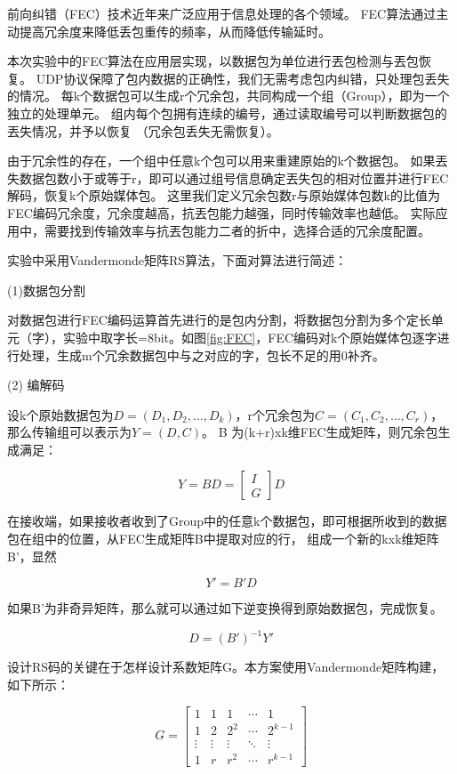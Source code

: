 \documentclass[onecolumn]{article}
\begin{document}
\begin{CJK*}{UTF8}{gbsn}
		前向纠错（FEC）技术近年来广泛应用于信息处理的各个领域。
		FEC算法通过主动提高冗余度来降低丢包重传的频率，从而降低传输延时。
		
		本次实验中的FEC算法在应用层实现，以数据包为单位进行丟包检测与丟包恢复。
		UDP协议保障了包内数据的正确性，我们无需考虑包内纠错，只处理包丢失的情况。
		每k个数据包可以生成r个冗余包，共同构成一个组（Group），即为一个独立的处理单元。
		组内每个包拥有连续的编号，通过读取编号可以判断数据包的丟失情况，并予以恢复
		（冗余包丢失无需恢复）。 
		
		由于冗余性的存在，一个组中任意k个包可以用来重建原始的k个数据包。
		如果丟失数据包数小于或等于r，即可以通过组号信息确定丟失包的相对位置并进行FEC解码，恢复k个原始媒体包。
		这里我们定义冗余包数r与原始媒体包数k的比值为FEC编码冗余度，冗余度越高，抗丟包能力越强，同时传输效率也越低。
		实际应用中，需要找到传输效率与抗丟包能力二者的折中，选择合适的冗余度配置。
		
		实验中采用Vandermonde矩阵RS算法，下面对算法进行简述：
		
		(1)数据包分割
		
		对数据包进行FEC编码运算首先进行的是包内分割，将数据包分割为多个定长单元（字），实验中取字长=8bit。如图\ref{fig:FEC}，FEC编码对k个原始媒体包逐字进行处理，生成m个冗余数据包中与之对应的字，包长不足的用0补齐。
		
		(2) 编解码
		
		设k个原始数据包为$D= (D_1,D_2,\dots,D_k)$，r个冗余包为$C=(C_1,C_2,\dots,C_r)$，那么传输组可以表示为$Y= (D,C)$。
		B 为(k+r)xk维FEC生成矩阵，则冗余包生成满足：
		
		$$Y=BD=\left[ \begin{array}{c}I\\G\end{array} \right ]D$$
		
		在接收端，如果接收者收到了Group中的任意k个数据包，即可根据所收到的数据包在组中的位置，从FEC生成矩阵B中提取对应的行， 组成一个新的kxk维矩阵B’，显然
		
		$$Y'=B'D$$
		
		如果B’为非奇异矩阵，那么就可以通过如下逆变换得到原始数据包，完成恢复。
		
		$$D=(B')^{-1}Y'$$
		
		设计RS码的关键在于怎样设计系数矩阵G。本方案使用Vandermonde矩阵构建，如下所示：
		
		$$G=
		\left[ \begin{array}{ccccc}
		1      & 1      & 1      & \cdots & 1       \\
		1      & 2      & 2^2    & \cdots & 2^{k-1} \\
		\vdots & \vdots & \vdots & \ddots & \vdots  \\
		1      & r      & r^2    & \cdots & r^{k-1}
		\end{array} 
		\right ]$$
		

\end{CJK*}
\end{document}

